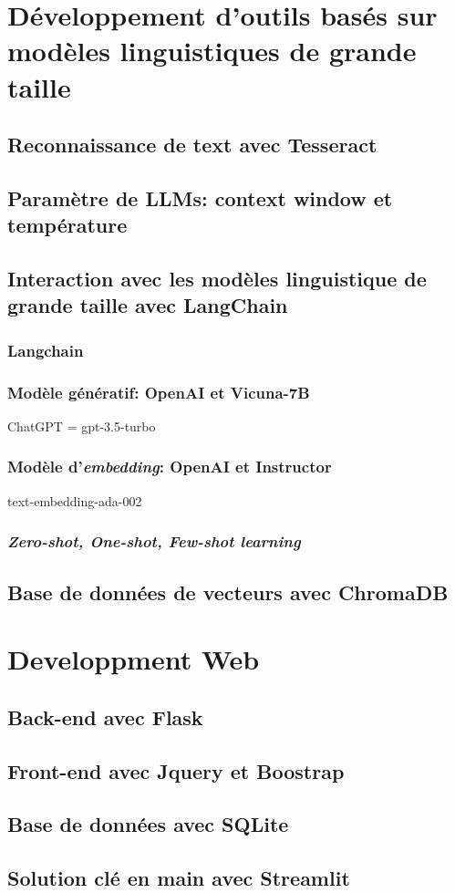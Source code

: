 \section{Développement d'outils basés sur modèles linguistiques de grande taille}
\subsection{Reconnaissance de text avec Tesseract}
\subsection{Paramètre de LLMs: context window et température}
\subsection{Interaction avec les modèles linguistique de grande taille avec LangChain}
\subsubsection{Langchain}
\subsubsection{Modèle génératif: OpenAI et Vicuna-7B}
ChatGPT = gpt-3.5-turbo
\subsubsection{Modèle d'\textit{embedding}: OpenAI et Instructor}
text-embedding-ada-002
\subsubsection{\textit{Zero-shot, One-shot, Few-shot learning}}
\subsection{Base de données de vecteurs avec ChromaDB}
\section{Developpment Web}
\subsection{Back-end avec Flask}
\subsection{Front-end avec Jquery et Boostrap}
\subsection{Base de données avec SQLite}
\subsection{Solution clé en main avec Streamlit}
